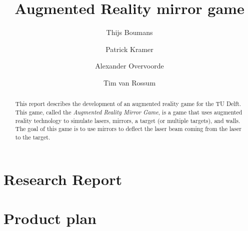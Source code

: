 \documentclass[]{report}
\title{Augmented Reality mirror game}
\author{Thijs Boumans \and Patrick Kramer \and
        Alexander Overvoorde \and Tim van Rossum}
\begin{document}
\maketitle

\begin{abstract}
This report describes the development of an augmented reality game
for the TU Delft. This game, called the \emph{Augmented Reality Mirror Game},
is a game that uses augmented reality technology to simulate lasers, mirrors,
a target (or multiple targets), and walls. The goal of this game is to use
mirrors to deflect the laser beam coming from the laser to the target.
\end{abstract}
\tableofcontents
\listoffigures







\appendix

\chapter{Research Report} \label{app:researchreport}





\chapter{Product plan} \label{app:productplan}







\pagebreak
{}

\end{document}
